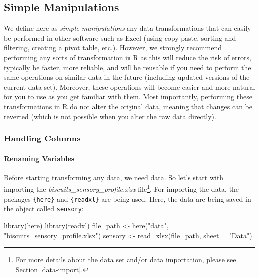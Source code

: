\documentclass[
]{krantz}
\makeatletter
\newenvironment{Shaded}{\begin{snugshade}}{\end{snugshade}}
\newcommand{\AttributeTok}[1]{\textcolor[rgb]{0.61,0.61,0.61}{#1}}
\newcommand{\FunctionTok}[1]{\textcolor[rgb]{0,0,0}{#1}}
\newcommand{\NormalTok}[1]{#1}
\newcommand{\OtherTok}[1]{\textcolor[rgb]{0.37,0.37,0.37}{#1}}
\newcommand{\StringTok}[1]{\textcolor[rgb]{0.5,0.5,0.5}{#1}}
\newenvironment{kframe}{%
\medskip{}
\setlength{\fboxsep}{.8em}
 \def\at@end@of@kframe{}%
 \ifinner\ifhmode%
  \def\at@end@of@kframe{\end{minipage}}%
  \begin{minipage}{\columnwidth}%
 \fi\fi%
 \def\FrameCommand##1{\hskip\@totalleftmargin \hskip-\fboxsep
 \colorbox{shadecolor}{##1}\hskip-\fboxsep
     \hskip-\linewidth \hskip-\@totalleftmargin \hskip\columnwidth}%
 \MakeFramed {\advance\hsize-\width
   \@totalleftmargin\z@ \linewidth\hsize
   \@setminipage}}%
 {\par\unskip\endMakeFramed%
 \at@end@of@kframe}
\renewenvironment{Shaded}{\begin{kframe}}{\end{kframe}}
\makeatother
\begin{document}
\hypertarget{simple_manips}{%
\subsection{Simple Manipulations}\label{simple_manips}}

We define here as \emph{simple manipulations} any data transformations that can easily be performed in other software such as Excel (using copy-paste, sorting and filtering, creating a pivot table, etc.). However, we strongly recommend performing any sorts of transformation in R as this will reduce the risk of errors, typically be faster, more reliable, and will be reusable if you need to perform the same operations on similar data in the future (including updated versions of the current data set). Moreover, these operations will become easier and more natural for you to use as you get familiar with them. Most importantly, performing these transformations in R do not alter the original data, meaning that changes can be reverted (which is not possible when you alter the raw data directly).

\hypertarget{handling-columns}{%
\subsubsection*{Handling Columns}\label{handling-columns}}


\hypertarget{renaming}{%
\paragraph*{Renaming Variables}\label{renaming}}

Before starting transforming any data, we need data. So let's start with importing the \emph{biscuits\_sensory\_profile.xlsx} file\footnote{For more details about the data set and/or data importation, please see Section \ref{data-import}.}. For importing the data, the packages \texttt{\{here\}} and \texttt{\{readxl\}} are being used. Here, the data are being saved in the object called \texttt{sensory}:

\begin{Shaded}
\begin{Highlighting}[]
\FunctionTok{library}\NormalTok{(here)}
\FunctionTok{library}\NormalTok{(readxl)}
\NormalTok{file\_path }\OtherTok{\textless{}{-}} \FunctionTok{here}\NormalTok{(}\StringTok{"data"}\NormalTok{, }\StringTok{"biscuits\_sensory\_profile.xlsx"}\NormalTok{)}
\NormalTok{sensory }\OtherTok{\textless{}{-}} \FunctionTok{read\_xlsx}\NormalTok{(file\_path, }\AttributeTok{sheet =} \StringTok{"Data"}\NormalTok{)}
\end{Highlighting}
\end{Shaded}
\end{document}
